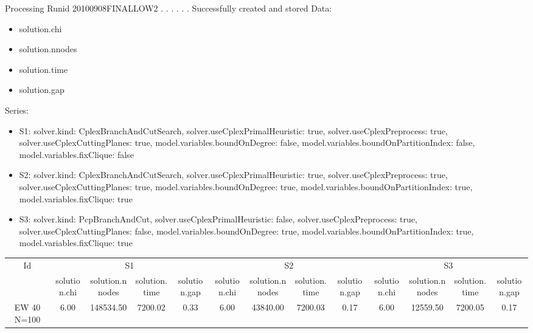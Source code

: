 \documentclass[landscape, 12pt]{report}
\begin{document}
 
Processing Runid 20100908FINALLOW2
. . . . . .  Successfully created and stored
Data:
\begin{itemize}
\item solution.chi
\item solution.nnodes
\item solution.time
\item solution.gap
\end{itemize}
Series:
\begin{itemize}
\item S1: solver.kind: CplexBranchAndCutSearch, solver.useCplexPrimalHeuristic: true, solver.useCplexPreprocess: true, solver.useCplexCuttingPlanes: true, model.variables.boundOnDegree: false, model.variables.boundOnPartitionIndex: false, model.variables.fixClique: false
\item S2: solver.kind: CplexBranchAndCutSearch, solver.useCplexPrimalHeuristic: true, solver.useCplexPreprocess: true, solver.useCplexCuttingPlanes: true, model.variables.boundOnDegree: true, model.variables.boundOnPartitionIndex: true, model.variables.fixClique: true
\item S3: solver.kind: PcpBranchAndCut, solver.useCplexPrimalHeuristic: false, solver.useCplexPreprocess: true, solver.useCplexCuttingPlanes: false, model.variables.boundOnDegree: true, model.variables.boundOnPartitionIndex: true, model.variables.fixClique: true
\end{itemize}
\begin{tabular}{|c|cccc|cccc|cccc|}
\hline
\multicolumn{1}{|c|}{Id} & \multicolumn{4}{|c|}{S1} & \multicolumn{4}{|c|}{S2} & \multicolumn{4}{|c|}{S3}
\\
 & solution.chi & solution.nnodes & solution.time & solution.gap & solution.chi & solution.nnodes & solution.time & solution.gap & solution.chi & solution.nnodes & solution.time & solution.gap
\\
\hline
EW 40 N=100 & 6.00 & 148534.50 & 7200.02 & 0.33 & 6.00 & 43840.00 & 7200.03 & 0.17 & 6.00 & 12559.50 & 7200.05 & 0.17
\\
\hline 
 \end{tabular}
 
\end{document}
